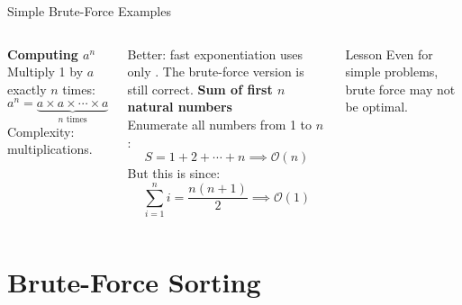 \documentclass[aspectratio=169]{beamer}
\begin{document}
\begin{frame}[shrink=12]{Simple Brute-Force Examples}
  \begin{columns}[T]
      \textbf{Computing $a^n$}\\[0.2em]
      Multiply 1 by $a$ exactly $n$ times:
      \[
        a^n = \underbrace{a \times a \times \cdots \times a}_{n \text{ times}}
      \]
      Complexity:  multiplications.
      \vspace{0.4em}

      Better: fast exponentiation uses only .
      The brute-force version is still correct.
      \textbf{Sum of first $n$ natural numbers}\\[0.2em]
      Enumerate all numbers from 1 to $n$:
      \[
        S = 1 + 2 + \cdots + n \implies \mathcal{O}(n)
      \]
      But this is  since:
      \[
        \sum_{i=1}^{n} i = \frac{n(n+1)}{2} \implies \mathcal{O}(1)
      \]
      \begin{exampleblock}{Lesson}
        Even for simple problems, brute force may not be optimal.
      \end{exampleblock}
  \end{columns}
\end{frame}

\section{Brute-Force Sorting}
\end{document}

